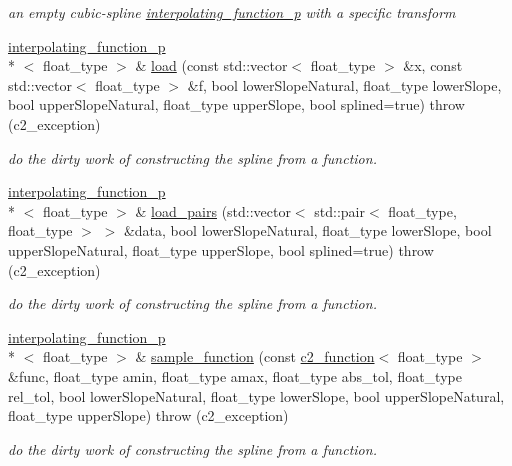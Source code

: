 \begin{DoxyCompactItemize}
\begin{DoxyCompactList}\small\item\em an empty cubic-\/spline \hyperlink{classinterpolating__function__p}{interpolating\-\_\-function\-\_\-p} with a specific transform \end{DoxyCompactList}\item 
\hyperlink{classinterpolating__function__p}{interpolating\-\_\-function\-\_\-p}\\*
$<$ float\-\_\-type $>$ \& \hyperlink{classinterpolating__function__p_a9a5f9a3a83dcb3d8addae44e5f40e2ee}{load} (const std\-::vector$<$ float\-\_\-type $>$ \&x, const std\-::vector$<$ float\-\_\-type $>$ \&f, bool lower\-Slope\-Natural, float\-\_\-type lower\-Slope, bool upper\-Slope\-Natural, float\-\_\-type upper\-Slope, bool splined=true)  throw (c2\-\_\-exception)
\begin{DoxyCompactList}\small\item\em do the dirty work of constructing the spline from a function. \end{DoxyCompactList}\item 
\hyperlink{classinterpolating__function__p}{interpolating\-\_\-function\-\_\-p}\\*
$<$ float\-\_\-type $>$ \& \hyperlink{classinterpolating__function__p_a1cfe18539d86f381a2e91749480f237d}{load\-\_\-pairs} (std\-::vector$<$ std\-::pair$<$ float\-\_\-type, float\-\_\-type $>$ $>$ \&data, bool lower\-Slope\-Natural, float\-\_\-type lower\-Slope, bool upper\-Slope\-Natural, float\-\_\-type upper\-Slope, bool splined=true)  throw (c2\-\_\-exception)
\begin{DoxyCompactList}\small\item\em do the dirty work of constructing the spline from a function. \end{DoxyCompactList}\item 
\hyperlink{classinterpolating__function__p}{interpolating\-\_\-function\-\_\-p}\\*
$<$ float\-\_\-type $>$ \& \hyperlink{classinterpolating__function__p_a7a241d879e2fb7cf50566fbb06c63066}{sample\-\_\-function} (const \hyperlink{classc2__function}{c2\-\_\-function}$<$ float\-\_\-type $>$ \&func, float\-\_\-type amin, float\-\_\-type amax, float\-\_\-type abs\-\_\-tol, float\-\_\-type rel\-\_\-tol, bool lower\-Slope\-Natural, float\-\_\-type lower\-Slope, bool upper\-Slope\-Natural, float\-\_\-type upper\-Slope)  throw (c2\-\_\-exception)
\begin{DoxyCompactList}\small\item\em do the dirty work of constructing the spline from a function. \end{DoxyCompactList}\item 

\end{DoxyCompactItemize}

